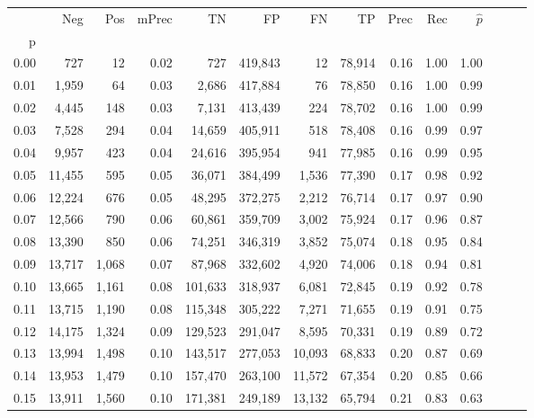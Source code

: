 \begin{tabular}{rrrrrrrrrrrrrr}
\toprule
{} &     Neg &    Pos & mPrec &       TN &       FP &      FN &      TP &  Prec &   Rec & $\hat{p}$ \\
p    &         &        &       &          &          &         &         &       &       &           \\
\midrule
0.00 &     727 &     12 &  0.02 &      727 &  419,843 &      12 &  78,914 &  0.16 &  1.00 &      1.00 \\
0.01 &   1,959 &     64 &  0.03 &    2,686 &  417,884 &      76 &  78,850 &  0.16 &  1.00 &      0.99 \\
0.02 &   4,445 &    148 &  0.03 &    7,131 &  413,439 &     224 &  78,702 &  0.16 &  1.00 &      0.99 \\
0.03 &   7,528 &    294 &  0.04 &   14,659 &  405,911 &     518 &  78,408 &  0.16 &  0.99 &      0.97 \\
0.04 &   9,957 &    423 &  0.04 &   24,616 &  395,954 &     941 &  77,985 &  0.16 &  0.99 &      0.95 \\
0.05 &  11,455 &    595 &  0.05 &   36,071 &  384,499 &   1,536 &  77,390 &  0.17 &  0.98 &      0.92 \\
0.06 &  12,224 &    676 &  0.05 &   48,295 &  372,275 &   2,212 &  76,714 &  0.17 &  0.97 &      0.90 \\
0.07 &  12,566 &    790 &  0.06 &   60,861 &  359,709 &   3,002 &  75,924 &  0.17 &  0.96 &      0.87 \\
0.08 &  13,390 &    850 &  0.06 &   74,251 &  346,319 &   3,852 &  75,074 &  0.18 &  0.95 &      0.84 \\
0.09 &  13,717 &  1,068 &  0.07 &   87,968 &  332,602 &   4,920 &  74,006 &  0.18 &  0.94 &      0.81 \\
0.10 &  13,665 &  1,161 &  0.08 &  101,633 &  318,937 &   6,081 &  72,845 &  0.19 &  0.92 &      0.78 \\
0.11 &  13,715 &  1,190 &  0.08 &  115,348 &  305,222 &   7,271 &  71,655 &  0.19 &  0.91 &      0.75 \\
0.12 &  14,175 &  1,324 &  0.09 &  129,523 &  291,047 &   8,595 &  70,331 &  0.19 &  0.89 &      0.72 \\
0.13 &  13,994 &  1,498 &  0.10 &  143,517 &  277,053 &  10,093 &  68,833 &  0.20 &  0.87 &      0.69 \\
0.14 &  13,953 &  1,479 &  0.10 &  157,470 &  263,100 &  11,572 &  67,354 &  0.20 &  0.85 &      0.66 \\
0.15 &  13,911 &  1,560 &  0.10 &  171,381 &  249,189 &  13,132 &  65,794 &  0.21 &  0.83 &      0.63 \\

\end{tabular}
